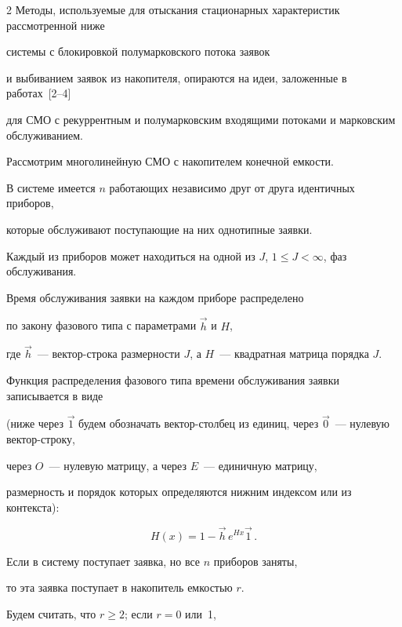 \begin{multicols}{2}
Методы, используемые для отыскания стационарных характеристик рассмотренной ниже


системы с блокировкой полумарковского потока заявок


и выбиванием заявок из накопителя, опираются на идеи, заложенные в работах~[2--4]


для СМО с рекуррентным и полумарковским входящими потоками и марковским обслуживанием.





Рассмотрим многолинейную СМО с накопителем конечной емкости.


В системе имеется $n$ работающих независимо друг от друга идентичных приборов,


которые обслуживают поступающие на них однотипные заявки.





Каждый из приборов может находиться на одной из $J$, $1\le J <\infty$, фаз обслуживания.


Время обслуживания заявки на каждом приборе распределено


по закону фазового типа с параметрами $\vec h$ и $H$,


где $\vec h$~--- вектор-строка размерности $J$, а $H$~--- квадратная матрица порядка $J$.


Функция распределения фазового типа времени обслуживания заявки записывается в виде


(ниже через $\vec 1$ будем обозначать вектор-столбец из единиц, через $\vec 0$~--- нулевую вектор-строку,


через $O$~--- нулевую матрицу, а через $E$~--- единичную матрицу,


размерность и порядок которых определяются нижним индексом или из контекста):


\begin{equation}


\label{PH-Distribution}


H(x) = 1-\vec h\, e^{Hx} \vec1\,.


\end{equation}





Если в систему поступает заявка, но все $n$ приборов заняты,


то эта заявка поступает в накопитель емкостью $r$.


Будем считать, что $r\ge 2$; если $r=0$ или~1,



\end{multicols}
